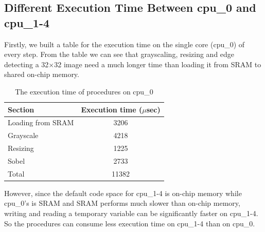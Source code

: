 \documentclass[conference]{IEEEtran}
\begin{document}
\subsection{Different Execution Time Between cpu\_0 and cpu\_1-4}
Firstly, we built a table for the execution time on the single core (cpu\_0) of every step. From the table we can see that grayscaling, resizing and edge detecting a 32$\times$32 image need a much longer time than loading it from SRAM to shared on-chip memory.\\ 
\begin{table}[h]
	\centering
	\caption{The execution time of procedures on cpu\_0}
	\label{tab:SinglecoreExeTime}
	\begin{tabular}{l|c}
		\toprule
		Section&Execution time ($\mu$sec)\\
		\midrule
		Loading from SRAM&3206\\
		Grayscale&4218\\
		Resizing&1225\\
		Sobel&2733\\
		\midrule
		Total&11382\\
		\bottomrule
	\end{tabular}
\end{table}
\indent
However, since the default code space for cpu\_1-4 is on-chip memory while cpu\_0's is SRAM and SRAM performs much slower than on-chip memory, writing and reading a temporary variable can be significantly faster on cpu\_1-4. So the procedures can consume less execution time on cpu\_1-4 than on cpu\_0. 
\end{document}
